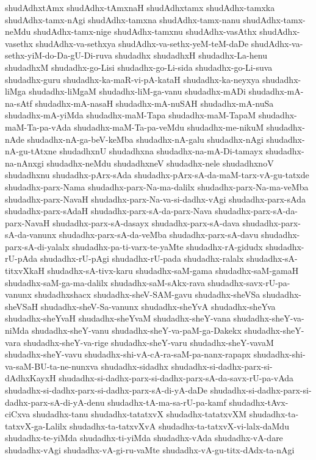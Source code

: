 {shudAdhxtAmx
shudAdhx-tAmxnaH
shudAdhxtamx
shudAdhx-tamxka
shudAdhx-tamx-nAgi
shudAdhx-tamxna
shudAdhx-tamx-nanu
shudAdhx-tamx-neMdu
shudAdhx-tamx-nige
shudAdhx-tamxnu
shudAdhx-vasAthx
shudAdhx-vasethx
shudAdhx-va-sethxya
shudAdhx-va-sethx-yeM-teM-daDe
shudAdhx-va-sethx-yiM-do-Da-gU-Di-ruva
shudadhx
shudadhxH
shudadhx-La-henu
shudadhxM
shudadhx-go-Lisi
shudadhx-go-Li-sida
shudadhx-go-Li-suva
shudadhx-guru
shudadhx-ka-maR-vi-pA-kataH
shudadhx-ka-neyxya
shudadhx-liMga
shudadhx-liMgaM
shudadhx-liM-ga-vanu
shudadhx-mADi
shudadhx-mA-na-sAtf
shudadhx-mA-nasaH
shudadhx-mA-nuSAH
shudadhx-mA-nuSa
shudadhx-mA-yiMda
shudadhx-maM-Tapa
shudadhx-maM-TapaM
shudadhx-maM-Ta-pa-vAda
shudadhx-maM-Ta-pa-veMdu
shudadhx-me-nikuM
shudadhx-nAde
shudadhx-nA-ga-beV-keMba
shudadhx-nA-galu
shudadhx-nAgi
shudadhx-nA-gu-tAtxne
shudadhxnU
shudadhxna
shudadhx-na-mA-Di-tamayx
shudadhx-na-nAnxgi
shudadhx-neMdu
shudadhxneV
shudadhx-nele
shudadhxnoV
shudadhxnu
shudadhx-pArx-sAda
shudadhx-pArx-sA-da-maM-tarx-vA-gu-tatxde
shudadhx-parx-Nama
shudadhx-parx-Na-ma-dalilx
shudadhx-parx-Na-ma-veMba
shudadhx-parx-NavaH
shudadhx-parx-Na-va-si-dadhx-vAgi
shudadhx-parx-sAda
shudadhx-parx-sAdaH
shudadhx-parx-sA-da-parx-Nava
shudadhx-parx-sA-da-parx-NavaH
shudadhx-parx-sA-dasayx
shudadhx-parx-sA-dava
shudadhx-parx-sA-da-vanunx
shudadhx-parx-sA-da-veMba
shudadhx-parx-sA-davu
shudadhx-parx-sA-di-yalalx
shudadhx-pa-ti-varx-te-yaMte
shudadhx-rA-gidudx
shudadhx-rU-pAda
shudadhx-rU-pAgi
shudadhx-rU-pada
shudadhx-ralalx
shudadhx-sA-titxvXkaH
shudadhx-sA-tivx-karu
shudadhx-saM-gama
shudadhx-saM-gamaH
shudadhx-saM-ga-ma-dalilx
shudadhx-saM-sAkx-rava
shudadhx-savx-rU-pa-vanunx
shudadhxshacx
shudadhx-sheV-SAM-gavu
shudadhx-sheVSa
shudadhx-sheVSaH
shudadhx-sheV-Sa-vanunx
shudadhx-sheYvA
shudadhx-sheYva
shudadhx-sheYvaH
shudadhx-sheYvaM
shudadhx-sheY-vana
shudadhx-sheY-va-niMda
shudadhx-sheY-vanu
shudadhx-sheY-va-paM-ga-Dakekx
shudadhx-sheY-vara
shudadhx-sheY-va-rige
shudadhx-sheY-varu
shudadhx-sheY-vavaM
shudadhx-sheY-vavu
shudadhx-shi-vA-cA-ra-saM-pa-nanx-rapapx
shudadhx-shi-va-saM-BU-ta-ne-nunxva
shudadhx-sidadhx
shudadhx-si-dadhx-parx-si-dAdhxKayxH
shudadhx-si-dadhx-parx-si-dadhx-parx-sA-da-savx-rU-pa-vAda
shudadhx-si-dadhx-parx-si-dadhx-parx-sA-di-yA-daDe
shudadhx-si-dadhx-parx-si-dadhx-parx-sA-di-yA-denu
shudadhx-tA-ma-sa-rU-pa-kamf
shudadhx-tAvx-ciCxva
shudadhx-tanu
shudadhx-tatatxvX
shudadhx-tatatxvXM
shudadhx-ta-tatxvX-ga-Lalilx
shudadhx-ta-tatxvXvA
shudadhx-ta-tatxvX-vi-lalx-daMdu
shudadhx-te-yiMda
shudadhx-ti-yiMda
shudadhx-vAda
shudadhx-vA-dare
shudadhx-vAgi
shudadhx-vA-gi-ru-vaMte
shudadhx-vA-gu-titx-dAdx-ta-nAgi
}
